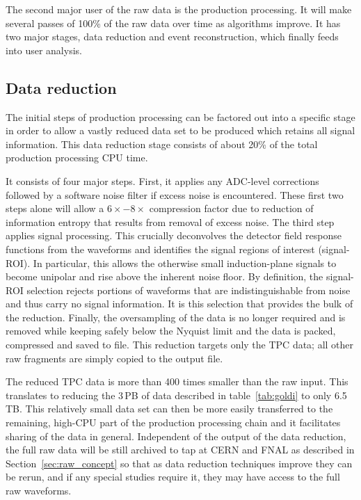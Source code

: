 The second major user of the raw data is the production processing.
It will make several passes of 100\% of the raw data over time as
algorithms improve.  It has two major stages, data reduction and 
event reconstruction, which finally feeds into user analysis.

\subsection{Data reduction}
\label{sec:datareduc}

The initial steps of production processing can be factored out into a
specific stage in order to allow a vastly reduced data set to be
produced which retains all signal information.  This data reduction
stage consists of about 20\% of the total production processing CPU
time.

It consists of four major steps.  First, it applies any ADC-level
corrections followed by a software noise filter if excess noise is
encountered.  These first two steps alone will allow a
$6\times - 8\times$ compression factor due to reduction of information
entropy that results from removal of excess noise.  The third step applies signal
processing.  This crucially deconvolves the detector field response
functions from the waveforms and identifies the signal regions of
interest (signal-ROI).  In particular, this allows the otherwise small
induction-plane signals to become unipolar and rise above the inherent
noise floor.  By definition, the signal-ROI selection rejects portions
of waveforms that are indistinguishable from noise and thus carry no
signal information.  It is this selection that provides the bulk of
the reduction.  Finally, the oversampling of the data is no longer
required and is removed while keeping safely below the Nyquist limit
and the data is packed, compressed and saved to file.  This reduction
targets only the TPC data; all other raw fragments are simply
copied to the output file.

The reduced TPC data is more than 400 times smaller than the raw
input. This translates to reducing the 3\,PB of data described in
table~\ref{tab:goldi} to only 6.5\,TB.  This relatively small data set
can then be more easily transferred to the remaining, high-CPU part of
the production processing chain and it facilitates sharing of the data
in general.  Independent of the output of the data reduction, the full
raw data will be still archived to tap at CERN and FNAL as described
in Section~\ref{sec:raw_concept} so that as data reduction techniques
improve they can be rerun, and if any special studies require it, they
may have access to the full raw waveforms.



